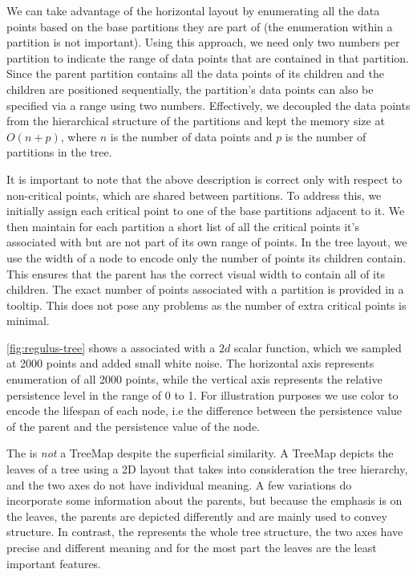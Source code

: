 We can take advantage of the horizontal layout by enumerating all the data points based on the base partitions they are part of (the enumeration within a partition is not important). Using this approach, we need only two numbers per partition to indicate the range of data points that are contained in that partition. Since the parent partition contains all the data points of its children and the children are positioned sequentially, the partition's data points can also be specified via a range using two numbers. Effectively, we decoupled the data points from the hierarchical structure of the partitions and kept the memory size at $O(n + p)$, where $n$ is the number of data points and $p$ is the number of partitions in the tree.

It is important to note that the above description is correct only with respect to non-critical points, which are shared between partitions. To address this, we initially assign each critical point to one of the base partitions adjacent to it. We then maintain for each partition a short list of all the critical points it's associated with but are not part of its own range of points. In the tree layout, we use the width of a node to encode only the number of points its children contain. This ensures that the parent has the correct visual width to contain all of its children. The exact number of points associated with a partition is provided in a tooltip. This does not pose any problems as the number of extra critical points is minimal. 

\autoref{fig:regulus-tree} shows a \RT associated with a $2d$ scalar function, which we sampled at 2000 points and added small white noise. The horizontal axis represents enumeration of all 2000 points, while the vertical axis represents the relative persistence level in the range of 0 to 1. For illustration purposes we use color to encode the lifespan of each node, i.e the difference between the persistence value of the parent and the persistence value of the node. 

The \RT is \textit{not} a TreeMap despite the superficial similarity. A TreeMap depicts the leaves of a tree using a 2D layout that takes into consideration the tree hierarchy, and the two axes do not have individual meaning. A few variations do incorporate some information about the parents, but because the emphasis is on the leaves, the parents are depicted differently and are mainly used to convey structure. In contrast, the \RT represents the whole tree structure, the two axes have precise and different meaning and for the most part the leaves are the least important features.

